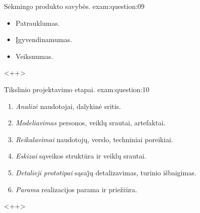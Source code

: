 \begin{question}{%
  Sėkmingo produkto savybės.
  }{exam:question:09}
  \begin{itemize}
    \item Patrauklumas.
    \item Įgyvendinamumas.
    \item Veiksnumas.
  \end{itemize}
  <++>
\end{question}

\begin{question}{%
  Tikslinio projektavimo etapai.
  }{exam:question:10}
  \begin{enumerate}
    \item \emph{Analizė} naudotojai, dalykinė sritis.
    \item \emph{Modeliavimas} personos, veiklų srautai, artefaktai.
    \item \emph{Reikalavimai} naudotojų, verslo, techniniai poreikiai.
    \item \emph{Eskizai} sąveikos struktūra ir veiklų srautai.
    \item \emph{Detalieji prototipai} sąsaj̇ų detalizavimas, turinio
      išbaigimas.
    \item \emph{Parama} realizacijos parama ir priežiūra.
  \end{enumerate}
  <++>
\end{question}
